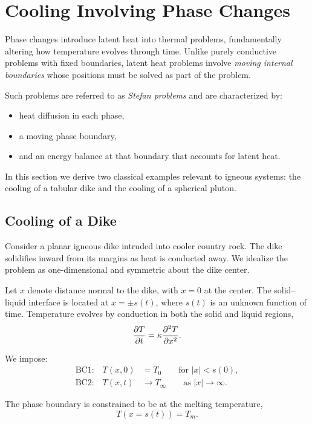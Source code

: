 \section{Cooling Involving Phase Changes}\label{sec:stefan}

Phase changes introduce latent heat into thermal problems, fundamentally altering how temperature evolves through time. Unlike purely conductive problems with fixed boundaries, latent heat problems involve \emph{moving internal boundaries} whose positions must be solved as part of the problem.

Such problems are referred to as \emph{Stefan problems} and are characterized by:
\begin{itemize}
    \item heat diffusion in each phase,
    \item a moving phase boundary,
    \item and an energy balance at that boundary that accounts for latent heat.
\end{itemize}

In this section we derive two classical examples relevant to igneous systems:
the cooling of a tabular dike and the cooling of a spherical pluton.

\subsection{Cooling of a Dike}

Consider a planar igneous dike intruded into cooler country rock. The dike
solidifies inward from its margins as heat is conducted away. We idealize the
problem as one-dimensional and symmetric about the dike center.

Let $x$ denote distance normal to the dike, with $x=0$ at the center. The solid--
liquid interface is located at $x = \pm s(t)$, where $s(t)$ is an unknown function
of time. Temperature evolves by conduction in both the solid and liquid regions,
\[
    \pdv{T}{t} = \kappa \pdv[2]{T}{x}.
\]

We impose:
\begin{align*}
    \text{BC1:}\quad T(x,0) &= T_0 \qquad \text{for } |x| < s(0), \\
    \text{BC2:}\quad T(x,t) &\rightarrow T_\infty \qquad \text{as } |x| \rightarrow \infty.
\end{align*}

The phase boundary is constrained to be at the melting temperature,
\[
    T(x = s(t)) = T_m .
\]


